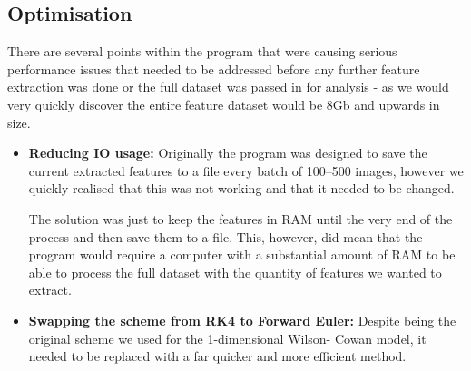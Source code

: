 \documentclass[10pt]{article}
\begin{document}
\begin{flushleft}
    \subsection{Optimisation}

    There are several points within the program that were causing serious performance issues that needed to
    be addressed before any further feature extraction was done or the full dataset was passed in for analysis
    - as we would very quickly discover the entire feature dataset would be 8Gb and upwards in size.

    \begin{itemize}
        \item \textbf{Reducing IO usage:} Originally the program was designed to save the current extracted features to
        a file every batch of 100--500 images, however we quickly realised that this was not working and that it needed
        to be changed.
        
        The solution was just to keep the features in RAM until the very end of the process and then save them to a file.
        This, however, did mean that the program would require a computer with a substantial amount of RAM to be able to
        process the full dataset with the quantity of features we wanted to extract.
        \item \textbf{Swapping the scheme from RK4 to Forward Euler:} Despite being the original scheme we used for the 1-dimensional Wilson-
        Cowan model, it needed to be replaced with a far quicker and more efficient method.
        

\end{itemize}
\end{flushleft}
\end{document}
